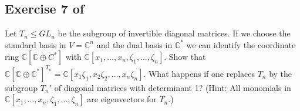 \documentclass[12pt]{amsart}
\newcommand{\C}{\mathbb{C}}
\theoremstyle{remark}
\theoremstyle{remark}
\begin{document}
\subsection*{Exercise 7 of \cite{KP96}}
Let $T_n \le GL_n$ be the subgroup of invertible diagonal matrices.
If we choose the standard basis in $V = \C^n$ and the dual basis in $\C^*$ we can identify the coordinate ring $\C[\C \oplus C^*]$ with $\C[x_1, \ldots, x_n, \zeta_1, \ldots, \zeta_n]$.
Show that $\C[\C \oplus \C^*]^{T_n} = \C[x_1 \zeta_1, x_2 \zeta_2, \ldots, x_n \zeta_n]$.
What happens if one replaces $T_n$ by the subgroup $T_n'$ of diagonal matrices with determinant 1?
(Hint: All monomials in $\C[x_1, \ldots, x_n, \zeta_1, \ldots, \zeta_n]$ are eigenvectors for $T_n$.)


\begin{bibdiv}
\begin{biblist}
\end{biblist}
\end{bibdiv}
\end{document}
